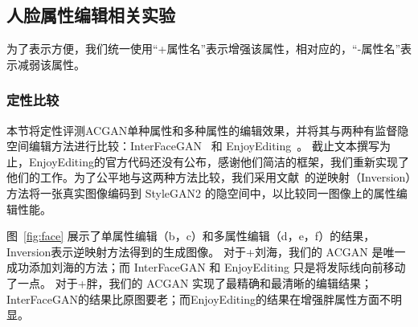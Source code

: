 \subsection{人脸属性编辑相关实验}
为了表示方便，我们统一使用“+属性名”表示增强该属性，相对应的，“-属性名”表示减弱该属性。

\subsubsection{定性比较}
本节将定性评测ACGAN单种属性和多种属性的编辑效果，并将其与两种有监督隐空间编辑方法进行比较：InterFaceGAN~\cite{interfacegan} 和 EnjoyEditing~\cite{iclr2021}。 截止文本撰写为止，EnjoyEditing的官方代码还没有公布，感谢他们简洁的框架，我们重新实现了他们的工作。为了公平地与这两种方法比较，我们采用文献~\cite{image2stylegan}的逆映射（Inversion）方法将一张真实图像编码到 StyleGAN2 的隐空间中，以比较同一图像上的属性编辑性能。

图~\ref{fig:face} 展示了单属性编辑（b，c）和多属性编辑（d，e，f）的结果，Inversion表示逆映射方法得到的生成图像。 对于+刘海，我们的 ACGAN 是唯一成功添加刘海的方法；而 InterFaceGAN 和 EnjoyEditing 只是将发际线向前移动了一点。 对于+胖，我们的 ACGAN 实现了最精确和最清晰的编辑结果；InterFaceGAN的结果比原图要老；而EnjoyEditing的结果在增强胖属性方面不明显。


